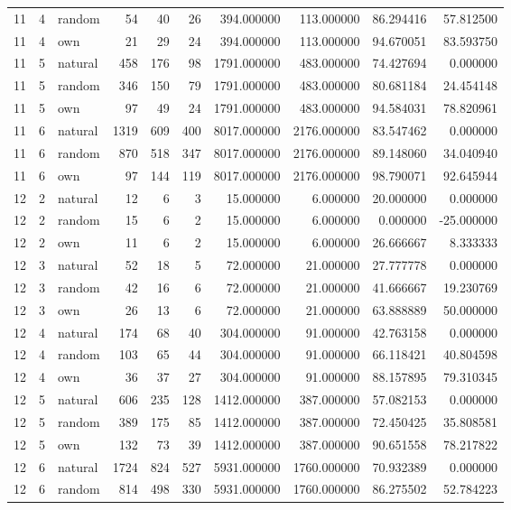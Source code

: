 \begin{table}[htbp]
\begin{tabular}{rrlrrrrrrr}
11 & 4 & random & 54 & 40 & 26 & 394.000000 & 113.000000 & 86.294416 & 57.812500 \\
11 & 4 & own & 21 & 29 & 24 & 394.000000 & 113.000000 & 94.670051 & 83.593750 \\
11 & 5 & natural & 458 & 176 & 98 & 1791.000000 & 483.000000 & 74.427694 & 0.000000 \\
11 & 5 & random & 346 & 150 & 79 & 1791.000000 & 483.000000 & 80.681184 & 24.454148 \\
11 & 5 & own & 97 & 49 & 24 & 1791.000000 & 483.000000 & 94.584031 & 78.820961 \\
11 & 6 & natural & 1319 & 609 & 400 & 8017.000000 & 2176.000000 & 83.547462 & 0.000000 \\
11 & 6 & random & 870 & 518 & 347 & 8017.000000 & 2176.000000 & 89.148060 & 34.040940 \\
11 & 6 & own & 97 & 144 & 119 & 8017.000000 & 2176.000000 & 98.790071 & 92.645944 \\
12 & 2 & natural & 12 & 6 & 3 & 15.000000 & 6.000000 & 20.000000 & 0.000000 \\
12 & 2 & random & 15 & 6 & 2 & 15.000000 & 6.000000 & 0.000000 & -25.000000 \\
12 & 2 & own & 11 & 6 & 2 & 15.000000 & 6.000000 & 26.666667 & 8.333333 \\
12 & 3 & natural & 52 & 18 & 5 & 72.000000 & 21.000000 & 27.777778 & 0.000000 \\
12 & 3 & random & 42 & 16 & 6 & 72.000000 & 21.000000 & 41.666667 & 19.230769 \\
12 & 3 & own & 26 & 13 & 6 & 72.000000 & 21.000000 & 63.888889 & 50.000000 \\
12 & 4 & natural & 174 & 68 & 40 & 304.000000 & 91.000000 & 42.763158 & 0.000000 \\
12 & 4 & random & 103 & 65 & 44 & 304.000000 & 91.000000 & 66.118421 & 40.804598 \\
12 & 4 & own & 36 & 37 & 27 & 304.000000 & 91.000000 & 88.157895 & 79.310345 \\
12 & 5 & natural & 606 & 235 & 128 & 1412.000000 & 387.000000 & 57.082153 & 0.000000 \\
12 & 5 & random & 389 & 175 & 85 & 1412.000000 & 387.000000 & 72.450425 & 35.808581 \\
12 & 5 & own & 132 & 73 & 39 & 1412.000000 & 387.000000 & 90.651558 & 78.217822 \\
12 & 6 & natural & 1724 & 824 & 527 & 5931.000000 & 1760.000000 & 70.932389 & 0.000000 \\
12 & 6 & random & 814 & 498 & 330 & 5931.000000 & 1760.000000 & 86.275502 & 52.784223 \\

\end{tabular}
\end{table}
